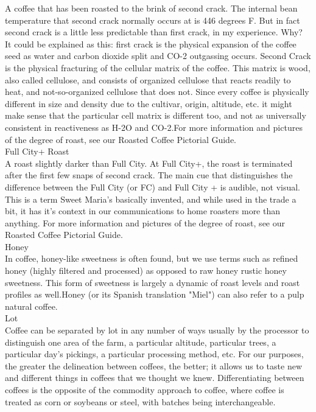 \documentclass[10pt,twoside,footinclude=true,headinclude=true]{scrbook} %
\begin{document}
\begin{multicols}{2}
A coffee that has been roasted to the brink of second crack. The internal bean temperature that second crack normally occurs at is 446 degrees F. But in fact second crack is a little less predictable than first crack, in my experience. Why? It could be explained as this: first crack is the physical expansion of the coffee seed as water and carbon dioxide split and CO-2 outgassing occurs. Second Crack is the physical fracturing of the cellular matrix of the coffee. This matrix is wood, also called cellulose, and consists of organized cellulose that reacts readily to heat, and not-so-organized cellulose that does not. Since every coffee is physically different in size and density due to the cultivar, origin, altitude, etc. it might make sense that the particular cell matrix is different too, and not as universally consistent in reactiveness as H-2O and CO-2.For more information and pictures of the degree of roast, see our  Roasted Coffee Pictorial Guide.\\
\medskip
{\smallcaps \small Full City+ Roast}\\
A roast slightly darker than Full City. At Full City+, the roast is terminated after the first few snaps of second crack. The main cue that distinguishes the difference between the Full City (or FC) and Full City + is audible, not visual. This is a term Sweet Maria's basically invented, and while used in the trade a bit, it has it's context in our communications to home roasters more than anything. For more information and pictures of the degree of roast, see our  Roasted Coffee Pictorial Guide.\\
\medskip
{\smallcaps \small Honey}\\
In coffee, honey-like sweetness is often found, but we use terms such as refined honey (highly filtered and processed) as opposed to raw honey rustic honey sweetness. This form of sweetness is largely a dynamic of roast levels and roast profiles as well.Honey (or its Spanish translation "Miel") can also refer to a pulp natural coffee.\\
\medskip
{\smallcaps \small Lot}\\
Coffee can be separated by lot in any number of ways usually by the processor to distinguish one area of the farm, a particular altitude, particular trees, a particular day's pickings, a particular processing method, etc. For our purposes, the greater the delineation between coffees, the better; it allows us to taste new and different things in coffees that we thought we knew. Differentiating between coffees is the opposite of the commodity approach to coffee, where coffee is treated as corn or soybeans or steel, with batches being interchangeable.\\

\end{multicols}
\end{document}

